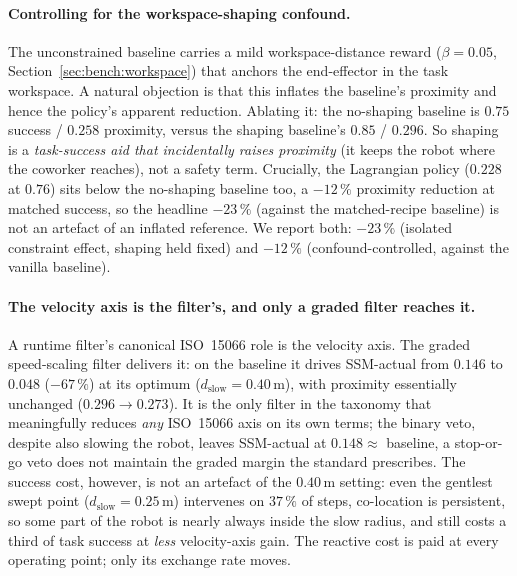 \documentclass[11pt,a4paper]{report}
\newcommand{\ssm}{SSM}
\newcommand{\iso}{ISO~15066}
\begin{document}
\paragraph{Controlling for the workspace-shaping confound.}
The unconstrained baseline carries a mild workspace-distance reward
($\beta = 0.05$, Section~\ref{sec:bench:workspace}) that anchors the
end-effector in the task workspace. A natural objection is that this
inflates the baseline's proximity and hence the policy's apparent
reduction. Ablating it: the no-shaping baseline is $0.75$ success /
$0.258$ proximity, versus the shaping baseline's $0.85$ / $0.296$. So
shaping is a \emph{task-success aid that incidentally raises
proximity} (it keeps the robot where the coworker reaches), not a
safety term. Crucially, the Lagrangian policy ($0.228$ at $0.76$) sits
below the no-shaping baseline too, a $-12\,\%$ proximity reduction at
matched success, so the headline $-23\,\%$ (against the matched-recipe
baseline) is not an artefact of an inflated reference. We report both:
$-23\,\%$ (isolated constraint effect, shaping held fixed) and
$-12\,\%$ (confound-controlled, against the vanilla baseline).

\paragraph{The velocity axis is the filter's, and only a graded filter
reaches it.}
A runtime filter's canonical \iso{} role is the velocity axis. The
graded speed-scaling filter delivers it: on the baseline it drives
\ssm{}-actual from $0.146$ to $0.048$ ($-67\,\%$) at its optimum
($d_{\mathrm{slow}} = 0.40$\,m), with proximity essentially unchanged
($0.296 \rightarrow 0.273$). It is the only filter in the taxonomy
that meaningfully reduces \emph{any} \iso{} axis on its own terms;
the binary veto, despite also slowing the robot, leaves
\ssm{}-actual at $0.148 \approx$ baseline, a stop-or-go veto does not
maintain the graded margin the standard prescribes. The success
cost, however, is not an artefact of the $0.40$\,m setting: even the
gentlest swept point ($d_{\mathrm{slow}} = 0.25$\,m) intervenes on
$37\,\%$ of steps, co-location is persistent, so some part of the
robot is nearly always inside the slow radius, and still costs a
third of task success at \emph{less} velocity-axis gain. The
reactive cost is paid at every operating point; only its exchange
rate moves.
\end{document}
